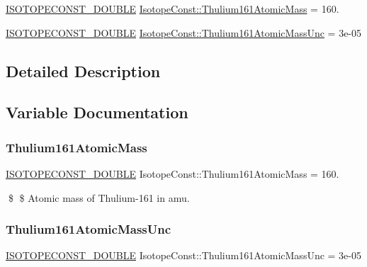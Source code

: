 \begin{DoxyCompactItemize}
\item 
\mbox{\hyperlink{group___isotope_const-_macros_ga8f45a7272ce02c0b4c65c44636ed719a}{I\+S\+O\+T\+O\+P\+E\+C\+O\+N\+S\+T\+\_\+\+D\+O\+U\+B\+LE}} \mbox{\hyperlink{group___isotope_const-_thulium-_tm161_ga386422fc2999e260678457ce89209fef}{Isotope\+Const\+::\+Thulium161\+Atomic\+Mass}} = 160.
\item 
\mbox{\hyperlink{group___isotope_const-_macros_ga8f45a7272ce02c0b4c65c44636ed719a}{I\+S\+O\+T\+O\+P\+E\+C\+O\+N\+S\+T\+\_\+\+D\+O\+U\+B\+LE}} \mbox{\hyperlink{group___isotope_const-_thulium-_tm161_ga2948b82f5314697ba7643186e2fc570e}{Isotope\+Const\+::\+Thulium161\+Atomic\+Mass\+Unc}} = 3e-\/05
\end{DoxyCompactItemize}


\subsection{Detailed Description}


\subsection{Variable Documentation}
\mbox{\label{group___isotope_const-_thulium-_tm161_ga386422fc2999e260678457ce89209fef}} 
\subsubsection{\texorpdfstring{Thulium161\+Atomic\+Mass}{Thulium161AtomicMass}}
{\footnotesize\ttfamily \mbox{\hyperlink{group___isotope_const-_macros_ga8f45a7272ce02c0b4c65c44636ed719a}{I\+S\+O\+T\+O\+P\+E\+C\+O\+N\+S\+T\+\_\+\+D\+O\+U\+B\+LE}} Isotope\+Const\+::\+Thulium161\+Atomic\+Mass = 160.}

\$ \$ Atomic mass of Thulium-\/161 in amu. \mbox{\label{group___isotope_const-_thulium-_tm161_ga2948b82f5314697ba7643186e2fc570e}} 
\subsubsection{\texorpdfstring{Thulium161\+Atomic\+Mass\+Unc}{Thulium161AtomicMassUnc}}
{\footnotesize\ttfamily \mbox{\hyperlink{group___isotope_const-_macros_ga8f45a7272ce02c0b4c65c44636ed719a}{I\+S\+O\+T\+O\+P\+E\+C\+O\+N\+S\+T\+\_\+\+D\+O\+U\+B\+LE}} Isotope\+Const\+::\+Thulium161\+Atomic\+Mass\+Unc = 3e-\/05}

